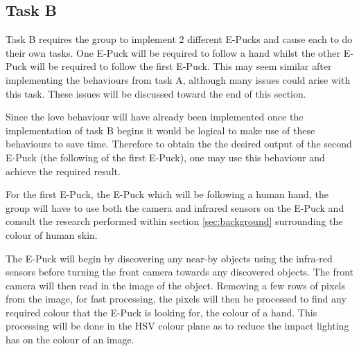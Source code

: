 \subsection{Task B}
Task B requires the group to implement 2 different E-Pucks and cause each to do their own tasks. One E-Puck will be required to follow a hand whilst the other E-Puck will be required to follow the first E-Puck. This may seem similar after implementing the behaviours from task A, although many issues could arise with this task. These issues will be discussed toward the end of this section.

Since the love behaviour will have already been implemented once the implementation of task B begins it would be logical to make use of these behaviours to save time. Therefore to obtain the the desired output of the second E-Puck (the following of the first E-Puck), one may use this behaviour and achieve the required result.

For the first E-Puck, the E-Puck which will be following a human hand, the group will have to use both the camera and infrared sensors on the E-Puck and consult the research performed within section \ref{sec:background} surrounding the colour of human skin.

The E-Puck will begin by discovering any near-by objects using the infra-red sensors before turning the front camera towards any discovered objects. The front camera will then read in the image of the object. Removing a few rows of pixels from the image, for fast processing, the pixels will then be processed to find any required colour that the E-Puck is looking for, the colour of a hand. This processing will be done in the HSV colour plane as to reduce the impact lighting has on the colour of an image.

